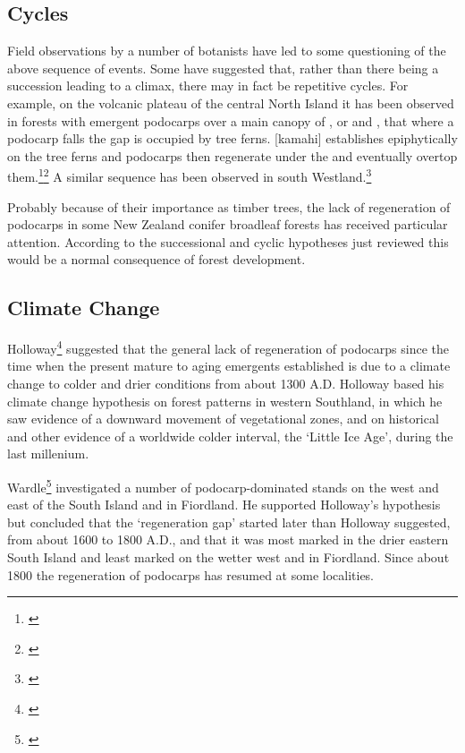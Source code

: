 \subsection[Cycles]{Cycles}

Field observations by a number of botanists have led to some questioning of the above sequence of events.
Some have suggested that, rather than there being a succession leading to a climax, there may in fact be repetitive cycles.
For example, on the volcanic plateau of the central North Island it has been observed in forests with emergent podocarps over a main canopy of , or  and , that where a podocarp falls the gap is occupied by tree ferns.
[kamahi] establishes epiphytically on the tree ferns and podocarps then regenerate under the  and eventually overtop them.\footnote{\cite{cameron1955mosaic}}\footnote{\cite{beveridge1973regeneration}} A similar sequence has been observed in south Westland.\footnote{\cite{poole1937survey}}

Probably because of their importance as timber trees, the lack of regeneration of podocarps in some New Zealand conifer broadleaf forests has received particular attention.
According to the successional and cyclic hypotheses just reviewed this would be a normal consequence of forest development.

\subsection{Climate Change}

Holloway\footnote{\cite{holloway1954forests}} suggested that the general lack of regeneration of podocarps since the time when the present mature to aging emergents established is due to a climate change to colder and drier conditions from about 1300 A.D.
Holloway based his climate change hypothesis on forest patterns in western Southland, in which he saw evidence of a downward movement of vegetational zones, and on historical and other evidence of a worldwide colder interval, the `Little Ice Age', during the last millenium.

Wardle\footnote{\cite{wardle1963regeneration}} investigated a number of podocarp-dominated stands on the west and east of the South Island and in Fiordland.
He supported Holloway's hypothesis but concluded that the `regeneration gap' started later than Holloway suggested, from about 1600 to 1800 A.D., and that it was most marked in the drier eastern South Island and least marked on the wetter west and in Fiordland.
Since about 1800 the regeneration of podocarps has resumed at some localities.


